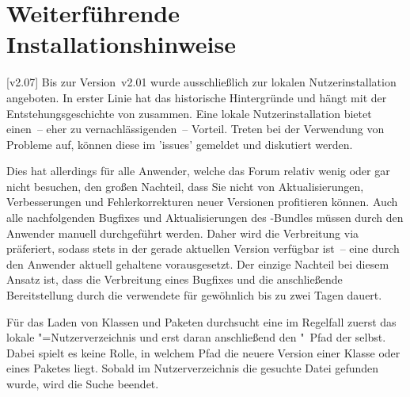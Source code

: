 \chapter{%
  Weiterführende Installationshinweise%
  \label{sec:install:ext}%
}

\NewDocumentCommand{}%

[v2.07]
\bigskip\noindent
Bis zur Version~v2.01 wurde \TUDScript ausschließlich zur lokalen 
Nutzerinstallation angeboten. In erster Linie hat das historische 
Hintergründe und hängt mit der Entstehungsgeschichte von \TUDScript zusammen. 
Eine lokale Nutzerinstallation bietet einen~-- eher zu vernachlässigenden~-- 
Vorteil. Treten bei der Verwendung von \TUDScript Probleme auf, können diese im 
\GitHubRepo'issues' gemeldet und diskutiert werden.

Dies hat allerdings für alle Anwender, welche das Forum relativ wenig oder gar 
nicht besuchen, den großen Nachteil, dass Sie nicht von Aktualisierungen, 
Verbesserungen und Fehlerkorrekturen neuer Versionen profitieren können. Auch 
alle nachfolgenden Bugfixes und Aktualisierungen des \TUDScript-Bundles müssen 
durch den Anwender manuell durchgeführt werden. Daher wird die Verbreitung via 
 präferiert, sodass \TUDScript stets in der gerade aktuellen 
Version verfügbar ist~-- eine durch den Anwender aktuell gehaltene 
\Distro vorausgesetzt. Der einzige Nachteil bei diesem 
Ansatz ist, dass die Verbreitung eines Bugfixes und die anschließende 
Bereitstellung durch die verwendete \Distro für gewöhnlich 
bis zu zwei Tagen dauert.

Für das Laden von Klassen und Paketen durchsucht eine \Distro im Regelfall 
zuerst das lokale "=Nutzerverzeichnis und erst daran anschließend 
den "~Pfad der \Distro selbst. Dabei spielt es keine Rolle, in 
welchem Pfad die neuere Version einer Klasse oder eines Paketes liegt. Sobald 
im Nutzerverzeichnis die gesuchte Datei gefunden wurde, wird die Suche beendet.

